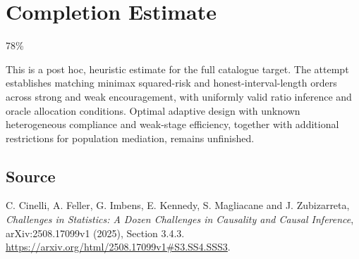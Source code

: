 \documentclass[11pt]{article}
\begin{document}
\section{Completion Estimate}
78\%

This is a post hoc, heuristic estimate for the full catalogue target.
The attempt establishes matching minimax squared-risk and honest-interval-length orders across strong and weak encouragement, with uniformly valid ratio inference and oracle allocation conditions. Optimal adaptive design with unknown heterogeneous compliance and weak-stage efficiency, together with additional restrictions for population mediation, remains unfinished.

\subsection*{Source}
C. Cinelli, A. Feller, G. Imbens, E. Kennedy, S. Magliacane and J. Zubizarreta,
\emph{Challenges in Statistics: A Dozen Challenges in Causality and Causal
Inference}, arXiv:2508.17099v1 (2025), Section 3.4.3.
\url{https://arxiv.org/html/2508.17099v1#S3.SS4.SSS3}.
\end{document}
